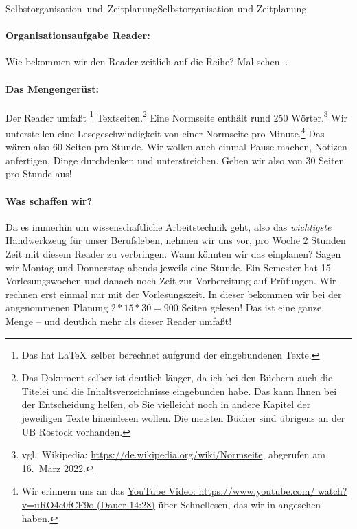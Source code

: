 

\unit{Selbstorganisation und Zeitplanung}{Selbstorganisation und Zeitplanung}

\paragraph{Organisationsaufgabe Reader:}
Wie bekommen wir den Reader zeitlich auf die Reihe? Mal sehen...

\paragraph{Das Mengengerüst:}
Der Reader umfaßt \footnote{Das hat \LaTeX\ selber berechnet
aufgrund der eingebundenen Texte.} Textseiten.\footnote{Das Dokument selber
ist deutlich länger, da ich bei den Büchern auch die Titelei und die Inhaltsverzeichnisse eingebunden habe.
Das kann Ihnen bei der Entscheidung helfen, ob Sie vielleicht noch in andere Kapitel der jeweiligen Texte
hineinlesen wollen. Die meisten Bücher sind übrigens an der UB Rostock vorhanden.} Eine Normseite ent\-hält rund 250 Wörter.\footnote{vgl.\ Wikipedia: \url{https://de.wikipedia.org/wiki/Normseite}, abgerufen am 16.\ März 2022.}
Wir unterstellen eine Lesegeschwindigkeit von einer Normseite pro Minute.\footnote{Wir erinnern uns an das
\href{https://www.youtube.com/watch?v=uRO4c0fCF9o}{YouTube Video: https://www.youtube.com/ watch?v=uRO4c0fCF9o (Dauer 14:28)}
über Schnellesen, das wir in  angesehen haben. 
} Das wären also 60 Seiten pro Stunde.
Wir wollen auch einmal Pause machen, Notizen anfertigen, Dinge durchdenken und
unterstreichen.
Gehen wir also von 30 Seiten pro Stunde aus!

\paragraph{Was schaffen wir?}
Da es immerhin um wissenschaftliche Arbeitstechnik geht, also das \textit{wichtigste} Handwerkzeug für unser
Berufsleben,
nehmen wir uns vor, pro Woche 2 Stunden Zeit mit diesem Reader zu verbringen.
Wann könnten wir das einplanen? Sagen wir Montag und Donnerstag abends jeweils
eine Stunde.
Ein Semester hat 15 Vorlesungswochen und danach noch Zeit zur
Vorbereitung auf Prüfungen. Wir rechnen erst einmal nur mit der Vorlesungszeit.
In dieser bekommen wir bei der angenommenen Planung
$2 * 15 * 30 = 900$ Seiten gelesen!
Das ist eine ganze Menge -- und deutlich mehr als dieser Reader umfaßt!


